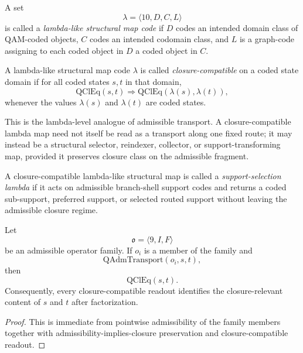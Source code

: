 \begin{definition}
A set
\[
\lambda=\langle 10,D,C,L\rangle
\]
is called a \emph{lambda-like structural map code} if $D$ codes an intended domain class of QAM-coded objects, $C$ codes an intended codomain class, and $L$ is a graph-code assigning to each coded object in $D$ a coded object in $C$.
\end{definition}

\begin{definition}
A lambda-like structural map code $\lambda$ is called \emph{closure-compatible} on a coded state domain if for all coded states $s,t$ in that domain,
\[
\mathrm{QClEq}(s,t)
\Longrightarrow
\mathrm{QClEq}(\lambda(s),\lambda(t)),
\]
whenever the values $\lambda(s)$ and $\lambda(t)$ are coded states.
\end{definition}

\begin{remark}
This is the lambda-level analogue of admissible transport. A closure-compatible lambda map need not itself be read as a transport along one fixed route; it may instead be a structural selector, reindexer, collector, or support-transforming map, provided it preserves closure class on the admissible fragment.
\end{remark}

\begin{definition}
A closure-compatible lambda-like structural map is called a \emph{support-selection lambda} if it acts on admissible branch-shell support codes and returns a coded sub-support, preferred support, or selected routed support without leaving the admissible closure regime.
\end{definition}

\begin{proposition}
Let
\[
\mathfrak{o}=\langle 9,I,F\rangle
\]
be an admissible operator family. If $o_i$ is a member of the family and
\[
\mathrm{QAdmTransport}(o_i,s,t),
\]
then
\[
\mathrm{QClEq}(s,t).
\]
Consequently, every closure-compatible readout identifies the closure-relevant content of $s$ and $t$ after factorization.
\end{proposition}

\begin{proof}
This is immediate from pointwise admissibility of the family members together with admissibility-implies-closure preservation and closure-compatible readout.
\end{proof}

